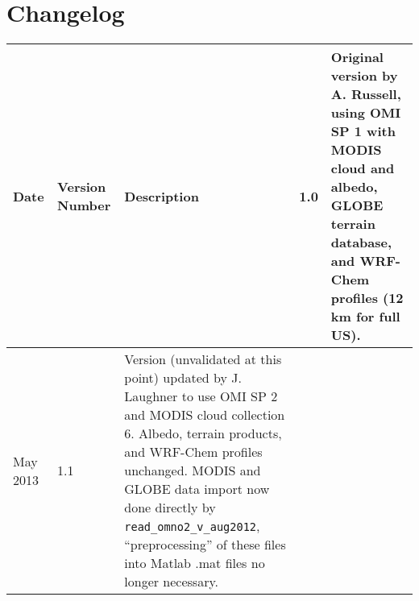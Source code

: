 \documentclass[12pt]{article}
\begin{document}
\section{Changelog}
\bgroup
\def\arraystretch{1.5}
	\begin{table}[h]
		\begin{longtabu} to \textwidth{| l | l | X |} \hline
			Date 		& 	Version Number		&	Description \endhead {}		&	1.0				&	Original version by A. Russell, using OMI SP 1 with MODIS cloud and albedo, GLOBE terrain database, and WRF-Chem profiles (12 km for full US). \\ \hline
			May 2013	&	1.1				&	Version (unvalidated at this point) updated by J. Laughner to use OMI SP 2 and MODIS cloud collection 6.  Albedo, terrain products, and WRF-Chem profiles unchanged.  MODIS and GLOBE data import now done directly by {\lstinline[breaklines=true]|read_omno2_v_aug2012|}, ``preprocessing'' of these files into Matlab .mat files no longer necessary. \\ \hline
		\end{longtabu}
	\end{table}
\egroup
\end{document}
